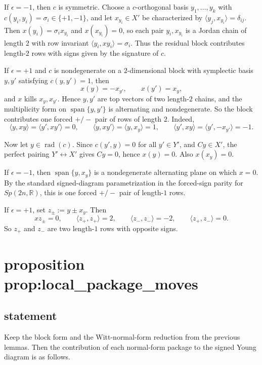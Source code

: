 \documentclass[
]{article}
\begin{document}
If \(\epsilon=-1\), then \(c\) is symmetric. Choose a \(c\)-orthogonal
basis \(y_1,\dots,y_k\) with \(c(y_i,y_i)=\sigma_i\in\{+1,-1\}\), and
let \(x_{y_i}\in X'\) be characterized by
\(\langle y_j,x_{y_i}\rangle=\delta_{ij}\). Then
\(x(y_i)=\sigma_i x_{y_i}\) and \(x(x_{y_i})=0\), so each pair
\(y_i,x_{y_i}\) is a Jordan chain of length \(2\) with row invariant
\(\langle y_i,xy_i\rangle=\sigma_i\). Thus the residual block
contributes length-\(2\) rows with signs given by the signature of
\(c\).

If \(\epsilon=+1\) and \(c\) is nondegenerate on a \(2\)-dimensional
block with symplectic basis \(y,y'\) satisfying \(c(y,y')=1\), then \[
x(y)=-x_{y'},\qquad x(y')=x_y,
\] and \(x\) kills \(x_y,x_{y'}\). Hence \(y,y'\) are top vectors of two
length-\(2\) chains, and the multiplicity form on
\(\operatorname{span}\{y,y'\}\) is alternating and nondegenerate. So the
block contributes one forced \(+/-\) pair of rows of length \(2\).
Indeed, \[
\langle y,xy\rangle=\langle y',xy'\rangle=0,\qquad
\langle y,xy'\rangle=\langle y,x_y\rangle=1,\qquad
\langle y',xy\rangle=\langle y',-x_{y'}\rangle=-1.
\]

Now let \(y\in\operatorname{rad}(c)\). Since \(c(y',y)=0\) for all
\(y'\in Y'\), and \(Cy\in X'\), the perfect pairing
\(Y'\leftrightarrow X'\) gives \(Cy=0\), hence \(x(y)=0\). Also
\(x(x_y)=0\).

If \(\epsilon=-1\), then \(\operatorname{span}\{y,x_y\}\) is a
nondegenerate alternating plane on which \(x=0\). By the standard
signed-diagram parametrization in the forced-sign parity for
\(Sp(2n,\mathbb R)\), this is one forced \(+/-\) pair of length-\(1\)
rows.

If \(\epsilon=+1\), set \(z_\pm:=y\pm x_y\). Then \[
xz_\pm=0,\qquad \langle z_+,z_+\rangle=2,\qquad \langle z_-,z_-\rangle=-2,\qquad \langle z_+,z_-\rangle=0.
\] So \(z_+\) and \(z_-\) are two length-\(1\) rows with opposite signs.

\section{proposition
prop:local\_package\_moves}\label{proposition-proplocal_package_moves}

\subsection{statement}\label{statement-10}

Keep the block form and the Witt-normal-form reduction from the previous
lemmas. Then the contribution of each normal-form package to the signed
Young diagram is as follows.
\end{document}
